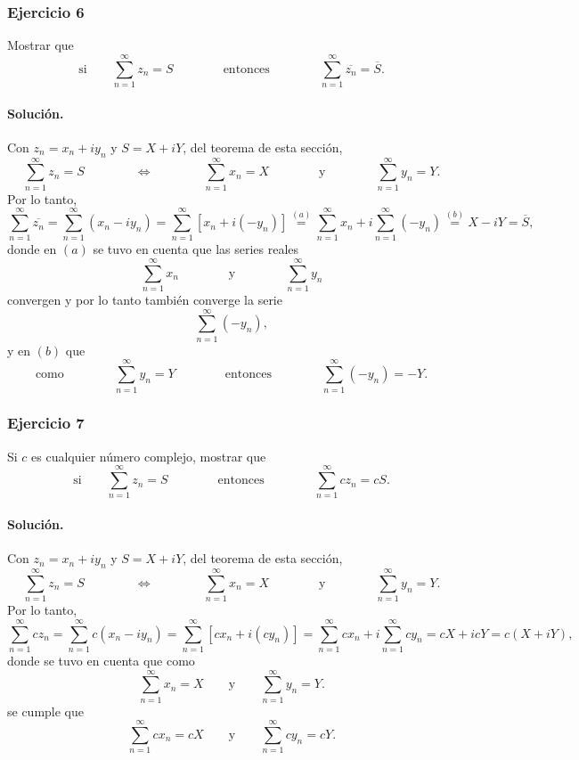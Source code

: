 \documentclass[a4paper]{report}
\begin{document}
\subsubsection{Ejercicio 6}

Mostrar que 
\[
 \textrm{si}\qquad 
 \sum_{n=1}^\infty z_n=S
 \qquad\qquad\textrm{entonces}\qquad\qquad
 \sum_{n=1}^\infty\overline{z_n}=\overline{S}.
\]

\paragraph{Solución.} Con \(z_n=x_n+iy_n\) y \(S=X+iY\), del teorema de esta sección, 
\[
 \sum_{n=1}^\infty z_n=S
 \qquad\qquad\Leftrightarrow\qquad\qquad
 \sum_{n=1}^\infty x_n=X
 \qquad\qquad\textrm{y}\qquad\qquad
 \sum_{n=1}^\infty y_n=Y. 
\]
Por lo tanto,
\[
 \sum_{n=1}^\infty\overline{z_n}=\sum_{n=1}^\infty(x_n-iy_n)=\sum_{n=1}^\infty[x_n+i(-y_n)]\overset{(a)}{=}\sum_{n=1}^\infty x_n+i\sum_{n=1}^\infty(-y_n)\overset{(b)}{=}X-iY=\overline{S},
\]
donde en \((a)\) se tuvo en cuenta que las series reales
\[
 \sum_{n=1}^\infty x_n
 \qquad\qquad\textrm{y}\qquad\qquad
 \sum_{n=1}^\infty y_n
\]
convergen y por lo tanto también converge la serie 
\[
 \sum_{n=1}^\infty(-y_n),
\]
y en \((b)\) que
\[
\textrm{como}\qquad\qquad
 \sum_{n=1}^\infty y_n=Y
 \qquad\qquad\textrm{entonces}\qquad\qquad
 \sum_{n=1}^\infty(-y_n)=-Y.
\]

\subsubsection{Ejercicio 7}

Si \(c\) es cualquier número complejo, mostrar que 
\[
 \textrm{si}\qquad 
 \sum_{n=1}^\infty z_n=S
 \qquad\qquad\textrm{entonces}\qquad\qquad
 \sum_{n=1}^\infty cz_n=cS.
\]

\paragraph{Solución.} Con \(z_n=x_n+iy_n\) y \(S=X+iY\), del teorema de esta sección, 
\[
 \sum_{n=1}^\infty z_n=S
 \qquad\qquad\Leftrightarrow\qquad\qquad
 \sum_{n=1}^\infty x_n=X
 \qquad\qquad\textrm{y}\qquad\qquad
 \sum_{n=1}^\infty y_n=Y. 
\]
Por lo tanto,
\[
 \sum_{n=1}^\infty cz_n=\sum_{n=1}^\infty c(x_n-iy_n)=\sum_{n=1}^\infty[cx_n+i(cy_n)]=\sum_{n=1}^\infty cx_n+i\sum_{n=1}^\infty cy_n=cX+icY=c(X+iY),
\]
donde se tuvo en cuenta que como
\[
 \sum_{n=1}^\infty x_n=X
 \qquad\textrm{y}\qquad
 \sum_{n=1}^\infty y_n=Y.
\]
se cumple que 
\[
 \sum_{n=1}^\infty cx_n=cX
 \qquad\textrm{y}\qquad
 \sum_{n=1}^\infty cy_n=cY.
\]
\end{document}
